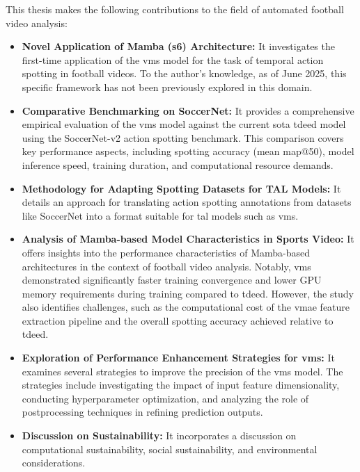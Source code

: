 This thesis makes the following contributions to the field of automated football video analysis:
\begin{itemize}
    \item \textbf{Novel Application of Mamba (\acrshort{s6}) Architecture:} It investigates the first-time application of the \acrfull{vms} model for the task of temporal action spotting in football videos. To the author's knowledge, as of June 2025, this specific framework has not been previously explored in this domain.

    \item \textbf{Comparative Benchmarking on SoccerNet:} It provides a comprehensive empirical evaluation of the \acrshort{vms} model against the current \acrlong{sota} \acrshort{tdeed} model using the SoccerNet-v2 action spotting benchmark. This comparison covers key performance aspects, including spotting accuracy (mean \acrlong{map}@50), model inference speed, training duration, and computational resource demands.

    \item \textbf{Methodology for Adapting Spotting Datasets for TAL Models:} It details an approach for translating action spotting annotations from datasets like SoccerNet into a format suitable for \acrfull{tal} models such as \acrshort{vms}. 

    \item \textbf{Analysis of Mamba-based Model Characteristics in Sports Video:} It offers insights into the performance characteristics of Mamba-based architectures in the context of football video analysis. Notably, \acrshort{vms} demonstrated significantly faster training convergence and lower GPU memory requirements during training compared to \acrshort{tdeed}. However, the study also identifies challenges, such as the computational cost of the \acrshort{vmae} feature extraction pipeline and the overall spotting accuracy achieved relative to \acrshort{tdeed}.

    \item \textbf{Exploration of Performance Enhancement Strategies for \acrshort{vms}:} It examines several strategies to improve the precision of the \acrshort{vms} model. The strategies include investigating the impact of input feature dimensionality, conducting hyperparameter optimization, and analyzing the role of postprocessing techniques in refining prediction outputs.

    \item \textbf{Discussion on Sustainability:} It incorporates a discussion on computational sustainability, social sustainability, and environmental considerations.
    
\end{itemize}
